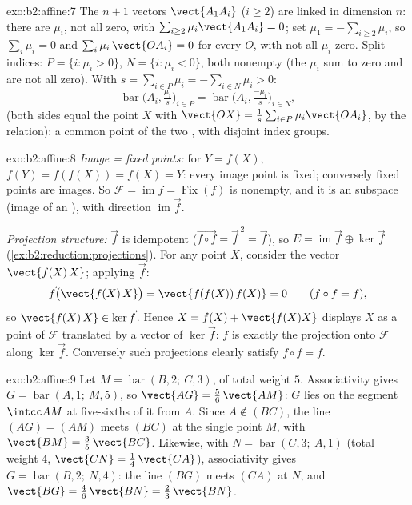 \begin{solution}{exo:b2:affine:7}
The $n + 1$ vectors $\vect{A_1A_i}$ ($i \geq 2$) are linked in
dimension $n$: there are $\mu_i$, not all zero, with $\sum_{i\geq2}
\mu_i\vect{A_1A_i} = 0$; set $\mu_1 = -\sum_{i \geq 2}\mu_i$, so
$\sum_{i}\mu_i = 0$ and $\sum_i \mu_i\,\vect{OA_i} = 0$ for every
$O$, with not all $\mu_i$ zero. Split indices: $P = \{i : \mu_i >
0\}$, $N = \{i : \mu_i < 0\}$, both nonempty (the $\mu_i$ sum to
zero and are not all zero). With $s = \sum_{i\in P}\mu_i =
-\sum_{i \in N}\mu_i > 0$:
\[
\operatorname{bar}\bigl(A_i, \tfrac{\mu_i}{s}\bigr)_{i \in P}
= \operatorname{bar}\bigl(A_i, \tfrac{-\mu_i}{s}\bigr)_{i \in N},
\]
(both sides equal the point $X$ with $\vect{OX} = \frac1s\sum_{i\in
P}\mu_i\vect{OA_i}$, by the relation): a common point of the two
, with disjoint index groups.
\end{solution}

\begin{solution}{exo:b2:affine:8}
\emph{Image = fixed points:} for $Y = f(X)$, $f(Y) = f(f(X)) =
f(X) = Y$: every image point is fixed; conversely fixed points are
images. So $\mathcal{F} = \operatorname{im} f =
\operatorname{Fix}(f)$ is nonempty, and it is an  subspace
(image of an ), with direction $\operatorname{im}\vec f$.

\emph{Projection structure:} $\vec f$ is idempotent ($\vec{f\circ
f} = \vec f^{\,2} = \vec f$), so $E = \operatorname{im}\vec f
\oplus \ker \vec f$ (\cref{ex:b2:reduction:projections}). For any
point $X$, consider the vector $\vect{f(X)\,X}$; applying $\vec f$:
\[
\vec f\bigl(\vect{f(X)\,X}\bigr) = \vect{f(f(X))\,f(X)} = 0
\qquad (f \circ f = f),
\]
so $\vect{f(X)\,X} \in \ker\vec f$. Hence $X = f(X) +
\vect{f(X)X}$ displays $X$ as a point of $\mathcal{F}$ translated
by a vector of $\ker\vec f$: $f$ is exactly the projection onto
$\mathcal{F}$ along $\ker\vec f$. Conversely such projections
clearly satisfy $f \circ f = f$.
\end{solution}

\begin{solution}{exo:b2:affine:9}
Let $M = \operatorname{bar}(B, 2;\ C, 3)$, of total weight $5$.
Associativity gives $G = \operatorname{bar}(A, 1;\ M, 5)$, so
$\vect{AG} = \frac56\,\vect{AM}$: $G$ lies on the segment
$\intcc AM$ at five-sixths of it from $A$. Since $A \notin
(BC)$, the line $(AG) = (AM)$ meets $(BC)$ at the single point
$M$, with $\vect{BM} = \frac35\,\vect{BC}$. Likewise, with $N =
\operatorname{bar}(C, 3;\ A, 1)$ (total weight $4$, $\vect{CN}
= \frac14\,\vect{CA}$), associativity gives $G =
\operatorname{bar}(B, 2;\ N, 4)$: the line $(BG)$ meets $(CA)$
at $N$, and $\vect{BG} = \frac46\,\vect{BN} =
\frac23\,\vect{BN}$.
\end{solution}

